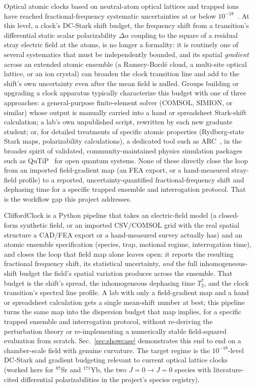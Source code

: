 \documentclass[aps,pra,superscriptaddress,groupedaddress,nofootinbib]{revtex4-2}
\begin{document}
Optical atomic clocks based on neutral-atom optical lattices and trapped
ions have reached fractional-frequency systematic uncertainties at or
below $10^{-18}$~\cite{Ludlow2015,Aeppli2024,Jia2026}. At this level, a
clock's DC-Stark shift budget, the frequency shift from a
transition's differential static scalar polarizability $\Delta\alpha$
coupling to the square of a residual stray electric field at the atoms,
is no longer a formality: it is routinely one of several systematics
that must be independently bounded, and its spatial \emph{gradient}
across an extended atomic ensemble (a Ramsey-Bord\'e cloud, a
multi-site optical lattice, or an ion crystal) can broaden the clock
transition line and add to the shift's own uncertainty even after the
mean field is nulled. Groups building or upgrading a clock apparatus
typically characterize this budget with one of three approaches: a
general-purpose finite-element solver (COMSOL, SIMION, or similar) whose
output is manually carried into a hand or spreadsheet Stark-shift
calculation; a lab's own unpublished script, rewritten by each new
graduate student; or, for detailed treatments of specific atomic
properties (Rydberg-state Stark maps, polarizability calculations), a
dedicated tool such as ARC~\cite{Sibalic2017}, in the broader spirit
of validated, community-maintained physics simulation packages such as
QuTiP~\cite{Lambert2024} for open quantum systems. None of these directly
close the loop from an imported field-gradient map (an FEA export, or a
hand-measured stray-field profile) to a reported, uncertainty-quantified
fractional-frequency shift and dephasing time for a specific trapped
ensemble and interrogation protocol. That is the workflow gap this
project addresses.

CliffordClock is a Python pipeline that takes an electric-field model
(a closed-form synthetic field, or an imported CSV/COMSOL grid with the
real spatial structure a CAD/FEA export or a hand-measured survey
actually has) and an atomic ensemble specification (species, trap,
motional regime, interrogation time), and closes the loop that field map
alone leaves open: it reports the resulting fractional frequency shift,
its statistical uncertainty, \emph{and} the full inhomogeneous-shift
budget the field's spatial variation produces across the ensemble. That
budget is the shift's spread, the inhomogeneous dephasing time $T_2^*$,
and the clock transition's spectral line profile. A lab with only a field-gradient map
and a hand or spreadsheet calculation gets a single mean-shift number at
best; this pipeline turns the same map into the dispersion budget that
map implies, for a specific trapped ensemble and interrogation protocol,
without re-deriving the perturbation theory or re-implementing a
numerically stable field-squared evaluation from scratch. Sec.~\ref{sec:showcase}
demonstrates this end to end on a chamber-scale field with genuine
curvature. The target regime is the $10^{-18}$-level DC-Stark and
gradient budgeting relevant to current optical lattice clocks (worked
here for $^{87}$Sr and $^{171}$Yb, the two $J{=}0\!\to\!J{=}0$ species
with literature-cited differential polarizabilities in the project's
species registry).
\end{document}
